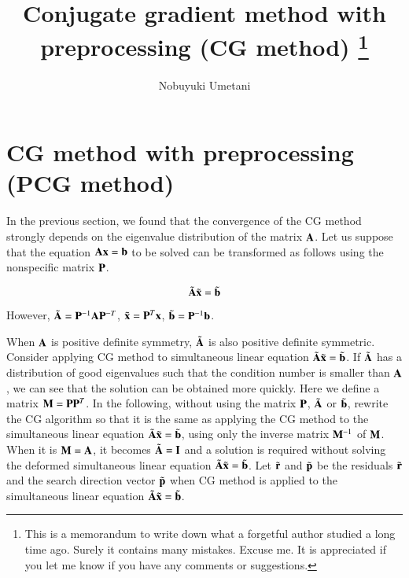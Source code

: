 


\title{Conjugate gradient method with preprocessing (CG method) \footnote{This is a memorandum to write down what a forgetful author studied a long time ago. Surely it contains many mistakes. Excuse me. It is appreciated if you let me know if you have any comments or suggestions. }}
\author{Nobuyuki Umetani}





\maketitle
\tableofcontents



\section{CG method with preprocessing (PCG method)}

In the previous section, we found that the convergence of the CG method strongly depends on the eigenvalue distribution of the matrix $\mathbf{A}$.
Let us suppose that the equation $\mathbf{A}\mathbf{x}=\mathbf{b}$ to be solved can be transformed as follows using the nonspecific matrix $\mathbf{P}$.

\begin{equation}
\tilde{\mathbf{A}}\tilde{\mathbf{x}}=\tilde{\mathbf{b}}
\end{equation}

However, $\tilde{\mathbf{A}}=\mathbf{P}^{-1}\mathbf{A}\mathbf{P}^{-T}$, $\tilde{\mathbf{x}}=\mathbf{P}^T\mathbf{x}$, $\tilde{\mathbf{b}}=\mathbf{P}^{-1}\mathbf{b}$.

When $\mathbf{A}$ is positive definite symmetry, $\tilde{\mathbf{A}}$ is also positive definite symmetric. Consider applying CG method to simultaneous linear equation $\tilde{\mathbf{A}}\tilde{\mathbf{x}}=\tilde{\mathbf{b}}$.
If $\tilde{\mathbf{A}}$ has a distribution of good eigenvalues ​​such that the condition number is smaller than $\mathbf{A}$, we can see that the solution can be obtained more quickly.
Here we define a matrix $\mathbf{M}=\mathbf{P}\mathbf{P}^T$. In the following, without using the matrix $\mathbf{P}$, $\tilde{\mathbf{A}}$ or $\tilde{\mathbf{b}}$, rewrite the CG algorithm so that it is the same as applying the CG method to the simultaneous linear equation $\tilde{\mathbf{A}}\tilde{\mathbf{x}}=\tilde{\mathbf{b}}$, using only the inverse matrix $\mathbf{M}^{-1}$ of $\mathbf{M}$.
When it is $\mathbf{M}=\mathbf{A}$, it becomes $\tilde{\mathbf{A}}=\mathbf{I}$ and a solution is required without solving the deformed simultaneous linear equation $\tilde{\mathbf{A}}\tilde{\mathbf{x}}=\tilde{\mathbf{b}}$.
Let $\tilde{\mathbf{r}}$ and $\tilde{\mathbf{p}}$ be the residuals $\tilde{\mathbf{r}}$ and the search direction vector $\tilde{\mathbf{p}}$ when CG method is applied to the simultaneous linear equation $\tilde{\mathbf{A}}\tilde{\mathbf{x}}=\tilde{\mathbf{b}}$.

